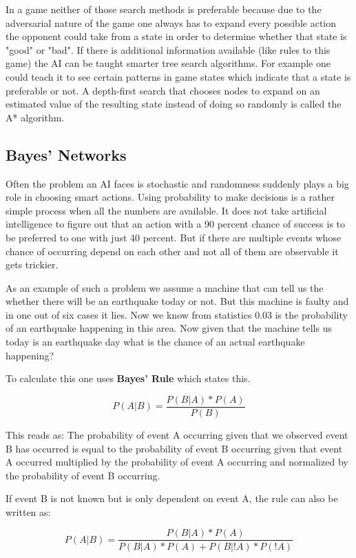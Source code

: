 In a game neither of those search methods is preferable because due to the adversarial nature of the game one always has to expand every possible action the opponent could take from a state in order to determine whether that state is "good" or "bad". If there is additional information available (like rules to this game) the AI can be taught smarter tree search algorithms. For example one could teach it to see certain patterns in game states which indicate that a state is preferable or not. A depth-first search that chooses nodes to expand on an estimated value of the resulting state instead of doing so randomly is called the A* algorithm.

\subsection{Bayes' Networks}

Often the problem an AI faces is stochastic and randomness suddenly plays a big role in choosing smart actions. Using probability to make decisions is a rather simple process when all the numbers are available. It does not take artificial intelligence to figure out that an action with a 90 percent chance of success is to be preferred to one with just 40 percent. But if there are multiple events whose chance of occurring depend on each other and not all of them are observable it gets trickier.

As an example of such a problem we assume a machine that can tell us the whether there will be an earthquake today or not. But this machine is faulty and in one out of six cases it lies. Now we know from statistics 0.03 is the probability of an earthquake happening in this area. Now given that the machine tells us today is an earthquake day what is the chance of an actual earthquake happening?

To calculate this one uses {\bf Bayes' Rule} which states this. 

\[P(A|B)=\frac{P(B|A) * P(A)}{P(B)}\]

This reads as: The probability of event A occurring given that we observed event B has occurred is equal to the probability of event B occurring given that event A occurred multiplied by the probability of event A occurring and normalized by the probability of event B occurring.

If event B is not known but is only dependent on event A, the rule can also be written as:

\[P(A|B)=\frac{P(B|A) * P(A)}{P(B|A)*P(A)+P(B|!A)*P(!A)}\]

